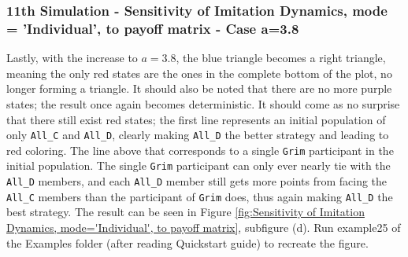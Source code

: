 \subsubsection{11th Simulation - Sensitivity of Imitation Dynamics, mode = 'Individual', to payoff matrix - Case a=3.8}
Lastly, with the increase to $a=3.8$, the blue triangle becomes a right triangle, meaning the only red states are the ones in the complete bottom of the plot, no longer forming a triangle. It should also be noted that there are no more purple states; the result once again becomes deterministic. It should come as no surprise that there still exist red states; the first line represents an initial population of only \texttt{All\_C} and \texttt{All\_D}, clearly making \texttt{All\_D} the better strategy and leading to red coloring. The line above that corresponds to a single \texttt{Grim} participant in the initial population. The single \texttt{Grim} participant can only ever nearly tie with the \texttt{All\_D} members, and each \texttt{All\_D} member still gets more points from facing the \texttt{All\_C} members than the participant of \texttt{Grim} does, thus again making \texttt{All\_D} the best strategy. The result can be seen in Figure \ref{fig:Sensitivity of Imitation Dynamics, mode='Individual', to payoff matrix}, subfigure (d). Run example25 of the Examples folder (after reading Quickstart guide) to recreate the figure.


